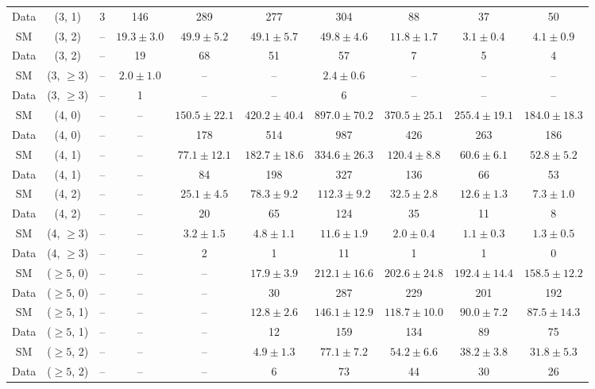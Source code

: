 \begin{table}[h!]
{\begin{tabular}{cccccccccc}
	Data & (3, 1) & 3 & 146 & 289 & 277 & 304 & 88 & 37 & 50 \\[0.5ex] 
	SM & (3, 2) & -- & $19.3\pm 3.0$ & $49.9\pm 5.2$ & $49.1\pm 5.7$ & $49.8\pm 4.6$ & $11.8\pm 1.7$ & $3.1\pm 0.4$ & $4.1\pm 0.9$ \\[0.5ex] 
	Data & (3, 2) & -- & 19 & 68 & 51 & 57 & 7 & 5 & 4 \\[0.5ex] 
	SM & (3, $\ge3$) & -- & $2.0\pm 1.0$ & -- & -- & $2.4\pm 0.6$ & -- & -- & -- \\[0.5ex] 
	Data & (3, $\ge3$) & -- & 1 & -- & -- & 6 & -- & -- & -- \\[0.5ex] 
	SM & (4, 0) & -- & -- & $150.5\pm 22.1$ & $420.2\pm 40.4$ & $897.0\pm 70.2$ & $370.5\pm 25.1$ & $255.4\pm 19.1$ & $184.0\pm 18.3$ \\[0.5ex] 
	Data & (4, 0) & -- & -- & 178 & 514 & 987 & 426 & 263 & 186 \\[0.5ex] 
	SM & (4, 1) & -- & -- & $77.1\pm 12.1$ & $182.7\pm 18.6$ & $334.6\pm 26.3$ & $120.4\pm 8.8$ & $60.6\pm 6.1$ & $52.8\pm 5.2$ \\[0.5ex] 
	Data & (4, 1) & -- & -- & 84 & 198 & 327 & 136 & 66 & 53 \\[0.5ex] 
	SM & (4, 2) & -- & -- & $25.1\pm 4.5$ & $78.3\pm 9.2$ & $112.3\pm 9.2$ & $32.5\pm 2.8$ & $12.6\pm 1.3$ & $7.3\pm 1.0$ \\[0.5ex] 
	Data & (4, 2) & -- & -- & 20 & 65 & 124 & 35 & 11 & 8 \\[0.5ex] 
	SM & (4, $\ge3$) & -- & -- & $3.2\pm 1.5$ & $4.8\pm 1.1$ & $11.6\pm 1.9$ & $2.0\pm 0.4$ & $1.1\pm 0.3$ & $1.3\pm 0.5$ \\[0.5ex] 
	Data & (4, $\ge3$) & -- & -- & 2 & 1 & 11 & 1 & 1 & 0 \\[0.5ex] 
	SM & ($\ge5$, 0) & -- & -- & -- & $17.9\pm 3.9$ & $212.1\pm 16.6$ & $202.6\pm 24.8$ & $192.4\pm 14.4$ & $158.5\pm 12.2$ \\[0.5ex] 
	Data & ($\ge5$, 0) & -- & -- & -- & 30 & 287 & 229 & 201 & 192 \\[0.5ex] 
	SM & ($\ge5$, 1) & -- & -- & -- & $12.8\pm 2.6$ & $146.1\pm 12.9$ & $118.7\pm 10.0$ & $90.0\pm 7.2$ & $87.5\pm 14.3$ \\[0.5ex] 
	Data & ($\ge5$, 1) & -- & -- & -- & 12 & 159 & 134 & 89 & 75 \\[0.5ex] 
	SM & ($\ge5$, 2) & -- & -- & -- & $4.9\pm 1.3$ & $77.1\pm 7.2$ & $54.2\pm 6.6$ & $38.2\pm 3.8$ & $31.8\pm 5.3$ \\[0.5ex] 
	Data & ($\ge5$, 2) & -- & -- & -- & 6 & 73 & 44 & 30 & 26 \\[0.5ex] 

\end{tabular}}
\end{table}
